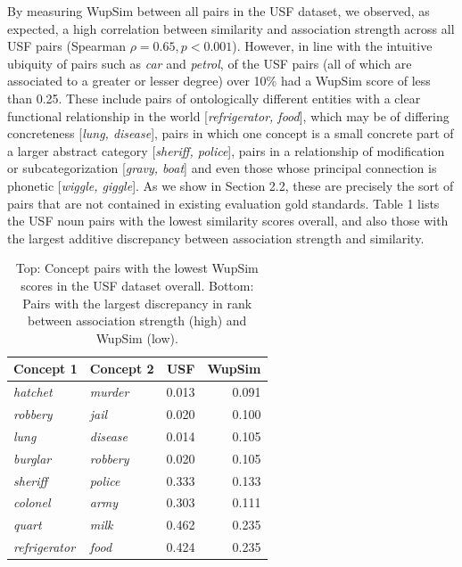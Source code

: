 By measuring WupSim between all pairs in the USF dataset, we observed, as expected, a high correlation between similarity and association strength across all USF pairs (Spearman \( \rho= 0.65, p<0.001 \)). However, in line with the intuitive ubiquity of pairs such as \emph{car} and \emph{petrol}, of the USF pairs (all of which are associated to a greater or lesser degree) over 10\% had a WupSim score of less than 0.25. These include pairs of ontologically different entities with a clear functional relationship in the world [\emph{refrigerator, food}], which may be of differing concreteness [\emph{lung, disease}], pairs in which one concept is a small concrete part of a larger abstract category [\emph{sheriff, police}], pairs in a relationship of modification or subcategorization [\emph{gravy, boat}] and even those whose principal connection is phonetic [\emph{wiggle, giggle}]. As we show in Section 2.2, these are precisely the sort of pairs that are not contained in existing evaluation gold standards. Table 1 lists the USF noun pairs with the lowest similarity scores overall, and also those with the largest additive discrepancy between association strength and similarity.

\begin{table}[t]\begin{center}\begin{tabular}{l|l|r|r}
Concept 1 & Concept 2 & USF & WupSim \\
\hline \emph{hatchet} & \emph{murder} & 0.013 & 0.091 \\
\emph{robbery} & \emph{jail} & 0.020 & 0.100 \\
\emph{lung} & \emph{disease} & 0.014 & 0.105 \\
\emph{burglar} & \emph{robbery}& 0.020 & 0.105\\
\hdashline \emph{sheriff} & \emph{police} & 0.333 & 0.133 \\
\emph{colonel} & \emph{army} & 0.303 & 0.111 \\
\emph{quart}& \emph{milk} & 0.462 & 0.235 \\
\emph{refrigerator} & \emph{food} & 0.424 & 0.235\\
\end{tabular}\end{center}\caption{\label{font-table} Top: Concept pairs with the lowest WupSim scores in the USF dataset overall. Bottom: Pairs with the largest discrepancy in rank between association strength (high) and WupSim (low).}\end{table}

